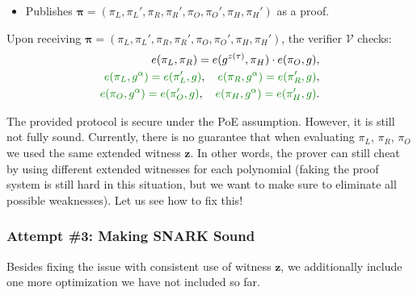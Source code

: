 \documentclass[../../book.tex]{subfiles}
\begin{document}
\begin{tcolorbox}
\begin{itemize}[label=]
\begin{align*}
            \pi_R \gets g^{r(\tau)}, & \quad\textcolor{green!50!black}{\pi_R' \gets g^{\alpha r(\tau)}} \\
            \pi_O \gets g^{o(\tau)}, & \quad\textcolor{green!50!black}{\pi_O' \gets g^{\alpha o(\tau)}} \\
            \pi_H \gets g^{h(\tau)}, & \quad\textcolor{green!50!black}{\pi_H' \gets g^{\alpha h(\tau)}}.
        \end{align*}
        using powers $\{g^{\tau^i}\}_{i \in [d]}$ and $\{g^{\alpha\tau^i}\}_{i \in [d]}$ from the proper parameters $\mathsf{pp}$.
        \item Publishes $\boldsymbol{\pi} = (\pi_L,\pi_L',\pi_R,\pi_R',\pi_O,\pi_O',\pi_H,\pi_H')$ as a proof.
    \end{itemize}
    Upon receiving $\boldsymbol{\pi} = (\pi_L,\pi_L',\pi_R,\pi_R',\pi_O,\pi_O',\pi_H,\pi_H')$, the verifier $\mathcal{V}$ checks:
    \begin{align*}
        e(\pi_L, \pi_R) = e(g^{z(\tau)}, \pi_H) \cdot e(\pi_O, g), \\
        \textcolor{green!50!black}{e(\pi_L, g^{\alpha}) = e(\pi_L', g)}, \quad \textcolor{green!50!black}{e(\pi_R, g^{\alpha}) = e(\pi_R', g)}, \\
        \textcolor{green!50!black}{e(\pi_O, g^{\alpha}) = e(\pi_O', g)}, \quad \textcolor{green!50!black}{e(\pi_H, g^{\alpha}) = e(\pi_H', g)}.
    \end{align*}
\end{tcolorbox}

The provided protocol is secure under the PoE assumption. However, it is still not fully sound. Currently, there is no guarantee that when evaluating $\pi_L$, $\pi_R$, $\pi_O$ we used the same extended witness $\mathbf{z}$. In other words, the prover can still cheat by using different extended witnesses for each polynomial (faking the proof system is still hard in this situation, but we want to make sure to eliminate all possible weaknesses). Let us see how to fix this!

\subsubsection{Attempt \#3: Making SNARK Sound}

Besides fixing the issue with consistent use of witness $\mathbf{z}$, we
additionally include one more optimization we have not included so far.
\end{document}
